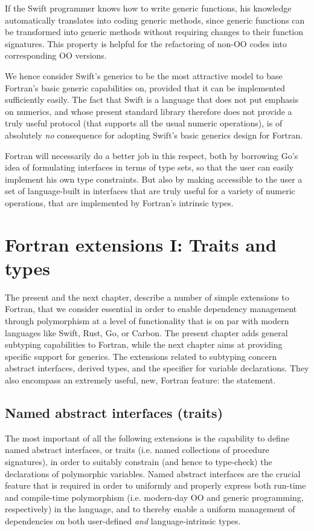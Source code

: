 \documentclass[11pt,oneside]{report}
\newcommand{\code}[1]{{\selectfont\ttfamily{#1}}}
\begin{document}
If the Swift programmer knows how to write generic functions, his
knowledge automatically translates into coding generic methods, since
generic functions can be transformed into generic methods without
requiring changes to their function signatures. This property is
helpful for the refactoring of non-OO codes into corresponding OO
versions.

We hence consider Swift's generics to be the most attractive model to
base Fortran's basic generic capabilities on, provided that it can be
implemented sufficiently easily. The fact that Swift is a language
that does not put emphasis on numerics, and whose present standard
library therefore does not provide a truly useful \code{Numeric}
protocol (that supports all the usual numeric operations), is of
absolutely \emph{no} consequence for adopting Swift's basic generics
design for Fortran.

Fortran will necessarily do a better job in this respect, both by
borrowing Go's idea of formulating interfaces in terms of type sets,
so that the user can easily implement his own type constraints. But
also by making accessible to the user a set of language-built in
interfaces that are truly useful for a variety of numeric operations,
that are implemented by Fortran's intrinsic types.


\chapter{Fortran extensions I: Traits and types}

The present and the next chapter, describe a number of simple
extensions to Fortran, that we consider essential in order to enable
dependency management through polymorphism at a level of functionality
that is on par with modern languages like Swift, Rust, Go, or
Carbon. The present chapter adds general subtyping capabilities to
Fortran, while the next chapter aims at providing specific support for
generics. The extensions related to subtyping concern abstract
interfaces, derived types, and the \code{class} specifier for variable
declarations. They also encompass an extremely useful, new, Fortran
feature: the \code{implements} statement.

\section{Named abstract interfaces (traits)}

The most important of all the following extensions is the capability
to define named abstract interfaces, or traits (i.e. named collections
of procedure signatures), in order to suitably constrain (and hence to
type-check) the declarations of polymorphic variables. Named abstract
interfaces are the crucial feature that is required in order to
uniformly and properly express both run-time and compile-time
polymorphism (i.e. modern-day OO and generic programming,
respectively) in the language, and to thereby enable a uniform
management of dependencies on both user-defined \emph{and}
language-intrinsic types.
\end{document}
